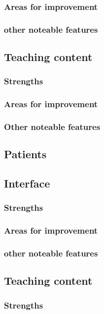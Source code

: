 \documentclass{sigchi}
\begin{document}
\subsubsection{Areas for improvement}
\subsubsection{other noteable features}

\subsection{Teaching content}
\subsubsection{Strengths}
\subsubsection{Areas for improvement}
\subsubsection{Other noteable features}

\subsection{Patients}

\subsection{Interface}
\subsubsection{Strengths}
\subsubsection{Areas for improvement}
\subsubsection{other noteable features}

\subsection{Teaching content}
\subsubsection{Strengths}
\end{document}
